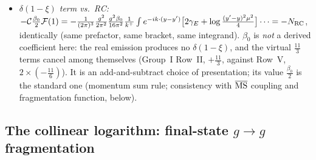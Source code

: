 \begin{itemize}
\begin{equation}
\widetilde{\mathcal P}_{gg}\otimes F-2N_{c}F(0)=2N_{c}\int_{0}^{1}\frac{d\xi}{\xi_{+}(1-\xi)_{+}}N(\xi)F(\xi)+\frac{\beta_{0}}{2}F(1),
\end{equation}
i.e.\ TARGET's DGLAP term plus the remnant ($-\mathcal{C}[\widetilde{\mathcal P}_{gg}\otimes\mathcal{F}-2N_{c}\mathcal{F}(0)]$) is exactly the KLSZ double-plus function times $2N_{c}$, plus $\frac{\beta_{0}}{2}\delta(1-\xi)$ (numerically equal to 20 digits for a model $F$, [1a]). The reason for the double subtraction is the same as in KLSZ (here: BFKL at $\xi\to0$, JIMWLK at $\xi\to1$). \textbf{AGREES.}
\item \emph{$\delta(1-\xi)$ term vs.\ RC:} $-\mathcal{C}\frac{\beta_{0}}{2}\mathcal{F}(1)=-\frac{1}{(2\pi)^{3}}\frac{g^{2}}{2\pi^{2}}\frac{g^{2}\beta_{0}}{16\pi^{2}}\frac{1}{k^{+}}\int e^{-ik\cdot(y-y')}\big[2\gamma_{E}+\log\frac{(y'-y)^{2}\mu^{2}}{4}\big]\dots=-N_{\rm RC}$, identically (same prefactor, same bracket, same integrand). $\beta_{0}$ is \emph{not} a derived coefficient here: the real emission produces no $\delta(1-\xi)$, and the virtual $\frac{11}{3}$ terms cancel among themselves (Group~I Row~II, $+\frac{11}{3}$, against Row~V, $2\times(-\frac{11}{6})$). It is an add-and-subtract choice of presentation; its value $\frac{\beta_{0}}{2}$ is the standard one (momentum sum rule; consistency with $\overline{\rm MS}$ coupling and fragmentation function, below).
\end{itemize}

\subsection{The collinear logarithm: final-state $g\to g$ fragmentation}

